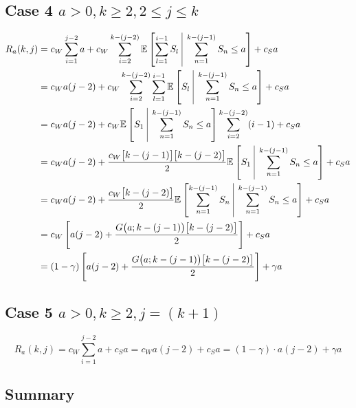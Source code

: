 \subsection{Case 4 $a > 0, k \geq 2, 2 \leq j \leq k$}

\begin{align*}
	R_{a} (k, j) & = c_{W} \sum_{i = 1}^{j - 2} a + c_{W} \sum_{i = 2}^{k - (j - 2)} \mathbb{E} \left[ \sum_{l = 1}^{i - 1} S_{l} \ \vline \ \sum_{n = 1}^{k - (j - 1)} S_{n} \leq a \right] + c_{S} a \\
	& = c_{W} a (j - 2) + c_{W} \sum_{i = 2}^{k - (j - 2)} \sum_{l = 1}^{i - 1} \mathbb{E} \left[ S_{l} \ \vline \ \sum_{n = 1}^{k - (j - 1)} S_{n} \leq a \right] + c_{S} a \\
	& = c_{W} a (j - 2) + c_{W} \mathbb{E} \left[ S_{1} \ \vline \ \sum_{n = 1}^{k - (j - 1)} S_{n} \leq a \right] \sum_{i = 2}^{k - (j - 2)} (i - 1) + c_{S} a \\
	& = c_{W} a (j - 2) + \frac{c_{W} \big[ k - (j - 1) \big] \big[ k - (j - 2) \big]}{2} \mathbb{E} \left[ S_{1} \ \vline \ \sum_{n = 1}^{k - (j - 1)} S_{n} \leq a \right] + c_{S} a \\
	& = c_{W} a (j - 2) + \frac{c_{W} \big[ k - (j - 2) \big]}{2} \mathbb{E} \left[ \sum_{n = 1}^{k - (j - 1)} S_{n} \ \vline \ \sum_{n = 1}^{k - (j - 1)} S_{n} \leq a \right] + c_{S} a \\
	& = c_{W} \left[ a (j - 2) + \frac{G \big( a; k - (j - 1) \big) \big[ k - (j - 2) \big]}{2} \right] + c_{S} a \\
	& = (1 - \gamma) \left[ a (j - 2) + \frac{G \big( a; k - (j - 1) \big) \big[ k - (j - 2) \big]}{2} \right] + \gamma a
\end{align*}

\subsection{Case 5 $a > 0, k \geq 2, j = (k + 1)$}

\begin{equation*}
	R_{a} (k, j) = c_{W} \sum_{i = 1}^{j - 2} a + c_{S} a = c_{W} a (j - 2) + c_{S} a = (1 - \gamma) \cdot a (j - 2) + \gamma a
\end{equation*}

\subsection{Summary}

